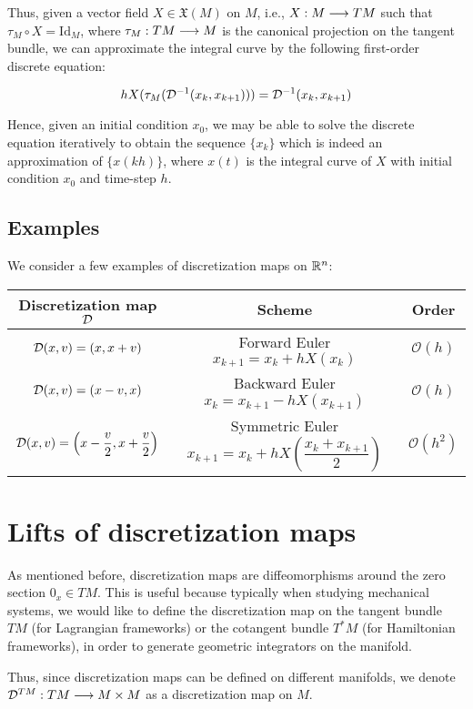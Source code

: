 Thus, given a vector field $X \in \mathfrak{X}(M)$ on $M$, i.e., $X: M \lra TM$ such that $\tau_M \circ X = \text{Id}_M$, where $\tau_M: TM \lra M$ is the canonical projection on the tangent bundle, we can approximate the integral curve by the following first-order discrete equation:

\[
  h X(\tau_M(\D^{-1}(x_k, x_{k+1}))) = \D^{-1}(x_k, x_{k+1})
\]

Hence, given an initial condition $x_0$, we may be able to solve the discrete equation iteratively to obtain the sequence $\{x_k\}$ which is indeed an approximation of $\{x(kh)\}$, where $x(t)$ is the integral curve of $X$ with initial condition $x_0$ and time-step $h$.

\subsection{Examples}
We consider a few examples of discretization maps on $\R[n]$:

\begin{table}[h]
\centering
\begin{tabular}{|c|c|c|}
\hline
 Discretization map $\D$ & Scheme & Order \\
\hline
 $\D(x,v) = (x, x + v)$ & Forward Euler $x_{k+1} = x_k + hX(x_k)$ & $\mathcal{O}(h)$ \\
 $\D(x,v) = (x - v, x)$ & Backward Euler $x_k = x_{k+1} - hX(x_{k+1})$ & $\mathcal{O}(h)$\\
 $\D(x, v) = \left(x - \dfrac{v}{2}, x + \dfrac{v}{2} \right)$ & Symmetric Euler $x_{k+1} = x_k + hX\left( \dfrac{x_k + x_{k+1}}{2}\right)$ & $\mathcal{O}(h^2)$\\
\hline
\end{tabular}
\end{table}


\section{Lifts of discretization maps}

As mentioned before, discretization maps are diffeomorphisms around the zero section $0_x \in TM$. 
This is useful because typically when studying mechanical systems, we would like to define the discretization map on the tangent bundle $TM$ (for Lagrangian frameworks) or the cotangent bundle $T^*M$ (for Hamiltonian frameworks), in order to generate geometric integrators on the manifold.

Thus, since discretization maps can be defined on different manifolds, we denote $\D^{TM} : TM \lra M \times M$ as a discretization map on $M$.

